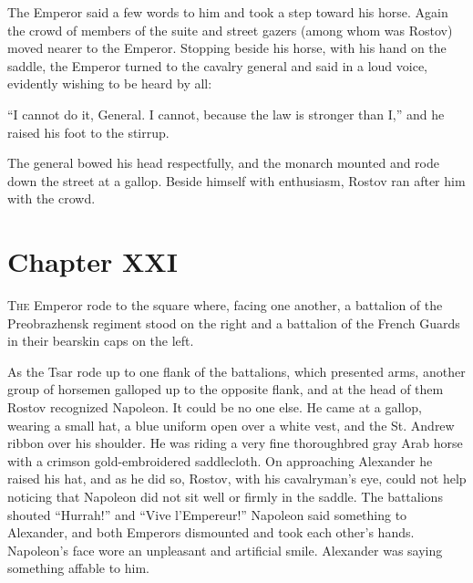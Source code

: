 The Emperor said a few words to him and took a step toward his
horse.  Again the crowd of members of the suite and street gazers
(among whom was Rostov) moved nearer to the Emperor. Stopping
beside his horse, with his hand on the saddle, the Emperor turned
to the cavalry general and said in a loud voice, evidently
wishing to be heard by all:

``I cannot do it, General. I cannot, because the law is stronger
than I,'' and he raised his foot to the stirrup.

The general bowed his head respectfully, and the monarch mounted
and rode down the street at a gallop. Beside himself with
enthusiasm, Rostov ran after him with the crowd.


\chapter*{Chapter XXI}
\ifaudio     
{} 
\fi

\lettrine[lines=2, loversize=0.3, lraise=0]{\initfamily T}{he}
Emperor rode to the square where, facing one another, a
battalion of the Preobrazhensk regiment stood on the right and a
battalion of the French Guards in their bearskin caps on the
left.

As the Tsar rode up to one flank of the battalions, which
presented arms, another group of horsemen galloped up to the
opposite flank, and at the head of them Rostov recognized
Napoleon. It could be no one else.  He came at a gallop, wearing
a small hat, a blue uniform open over a white vest, and the
St. Andrew ribbon over his shoulder. He was riding a very fine
thoroughbred gray Arab horse with a crimson gold-embroidered
saddlecloth. On approaching Alexander he raised his hat, and as
he did so, Rostov, with his cavalryman's eye, could not help
noticing that Napoleon did not sit well or firmly in the
saddle. The battalions shouted ``Hurrah!'' and ``Vive
l'Empereur!'' Napoleon said something to Alexander, and both
Emperors dismounted and took each other's hands.  Napoleon's face
wore an unpleasant and artificial smile. Alexander was saying
something affable to him.

